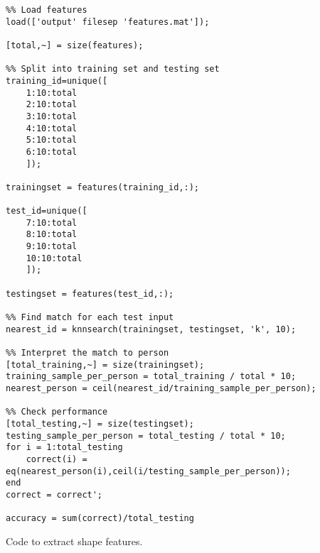 \begin{verbatim}
%% Load features
load(['output' filesep 'features.mat']);

[total,~] = size(features);

%% Split into training set and testing set
training_id=unique([
    1:10:total
    2:10:total
    3:10:total
    4:10:total
    5:10:total
    6:10:total
    ]);

trainingset = features(training_id,:);

test_id=unique([
    7:10:total
    8:10:total
    9:10:total
    10:10:total
    ]);

testingset = features(test_id,:);

%% Find match for each test input
nearest_id = knnsearch(trainingset, testingset, 'k', 10);

%% Interpret the match to person
[total_training,~] = size(trainingset);
training_sample_per_person = total_training / total * 10;
nearest_person = ceil(nearest_id/training_sample_per_person);

%% Check performance
[total_testing,~] = size(testingset);
testing_sample_per_person = total_testing / total * 10;
for i = 1:total_testing
    correct(i) = eq(nearest_person(i),ceil(i/testing_sample_per_person));
end
correct = correct';

accuracy = sum(correct)/total_testing
\end{verbatim}
\clearpage

Code to extract shape features.

